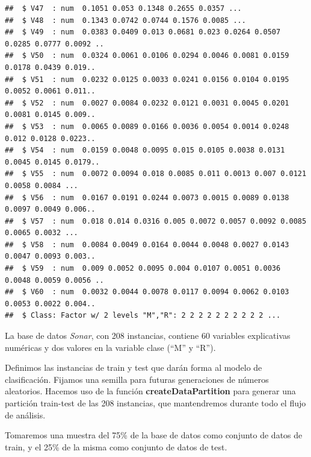 \documentclass[
]{article}
\newenvironment{Shaded}{\begin{snugshade}}{\end{snugshade}}
\newcommand{\DataTypeTok}[1]{\textcolor[rgb]{0.13,0.29,0.53}{#1}}
\newcommand{\DecValTok}[1]{\textcolor[rgb]{0.00,0.00,0.81}{#1}}
\newcommand{\KeywordTok}[1]{\textcolor[rgb]{0.13,0.29,0.53}{\textbf{#1}}}
\newcommand{\NormalTok}[1]{#1}
\newcommand{\OperatorTok}[1]{\textcolor[rgb]{0.81,0.36,0.00}{\textbf{#1}}}
\newcommand{\OtherTok}[1]{\textcolor[rgb]{0.56,0.35,0.01}{#1}}
\newcommand{\StringTok}[1]{\textcolor[rgb]{0.31,0.60,0.02}{#1}}
\begin{document}
\begin{verbatim}
##  $ V47  : num  0.1051 0.053 0.1348 0.2655 0.0357 ...
##  $ V48  : num  0.1343 0.0742 0.0744 0.1576 0.0085 ...
##  $ V49  : num  0.0383 0.0409 0.013 0.0681 0.023 0.0264 0.0507 0.0285 0.0777 0.0092 ..
##  $ V50  : num  0.0324 0.0061 0.0106 0.0294 0.0046 0.0081 0.0159 0.0178 0.0439 0.019..
##  $ V51  : num  0.0232 0.0125 0.0033 0.0241 0.0156 0.0104 0.0195 0.0052 0.0061 0.011..
##  $ V52  : num  0.0027 0.0084 0.0232 0.0121 0.0031 0.0045 0.0201 0.0081 0.0145 0.009..
##  $ V53  : num  0.0065 0.0089 0.0166 0.0036 0.0054 0.0014 0.0248 0.012 0.0128 0.0223..
##  $ V54  : num  0.0159 0.0048 0.0095 0.015 0.0105 0.0038 0.0131 0.0045 0.0145 0.0179..
##  $ V55  : num  0.0072 0.0094 0.018 0.0085 0.011 0.0013 0.007 0.0121 0.0058 0.0084 ...
##  $ V56  : num  0.0167 0.0191 0.0244 0.0073 0.0015 0.0089 0.0138 0.0097 0.0049 0.006..
##  $ V57  : num  0.018 0.014 0.0316 0.005 0.0072 0.0057 0.0092 0.0085 0.0065 0.0032 ...
##  $ V58  : num  0.0084 0.0049 0.0164 0.0044 0.0048 0.0027 0.0143 0.0047 0.0093 0.003..
##  $ V59  : num  0.009 0.0052 0.0095 0.004 0.0107 0.0051 0.0036 0.0048 0.0059 0.0056 ..
##  $ V60  : num  0.0032 0.0044 0.0078 0.0117 0.0094 0.0062 0.0103 0.0053 0.0022 0.004..
##  $ Class: Factor w/ 2 levels "M","R": 2 2 2 2 2 2 2 2 2 2 ...
\end{verbatim}

La base de datos \emph{Sonar}, con 208 instancias, contiene 60 variables
explicativas numéricas y dos valores en la variable clase (``M'' y
``R'').

Definimos las instancias de train y test que darán forma al modelo de
clasificación. Fijamos una semilla para futuras generaciones de números
aleatorios. Hacemos uso de la función \textbf{createDataPartition} para
generar una partición train-test de las 208 instancias, que mantendremos
durante todo el flujo de análisis.

Tomaremos una muestra del 75\% de la base de datos como conjunto de
datos de train, y el 25\% de la misma como conjunto de datos de test.

\begin{Shaded}
\end{Shaded}
\end{document}
